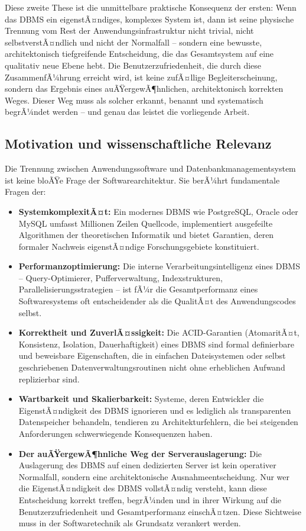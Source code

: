 ﻿\documentclass[a4paper,12pt]{article}
\theoremstyle{definition}
\begin{document}
Diese zweite These ist die unmittelbare praktische Konsequenz der ersten: Wenn das DBMS ein eigenstÃ¤ndiges, komplexes System ist, dann ist seine physische Trennung vom Rest der Anwendungsinfrastruktur nicht trivial, nicht selbstverstÃ¤ndlich und nicht der Normalfall -- sondern eine bewusste, architektonisch tiefgreifende Entscheidung, die das Gesamtsystem auf eine qualitativ neue Ebene hebt. Die Benutzerzufriedenheit, die durch diese ZusammenfÃ¼hrung erreicht wird, ist keine zufÃ¤llige Begleiterscheinung, sondern das Ergebnis eines auÃŸergewÃ¶hnlichen, architektonisch korrekten Weges. Dieser Weg muss als solcher erkannt, benannt und systematisch begrÃ¼ndet werden -- und genau das leistet die vorliegende Arbeit.

\subsection{Motivation und wissenschaftliche Relevanz}

Die Trennung zwischen Anwendungssoftware und Datenbankmanagementsystem ist keine bloÃŸe Frage der Softwarearchitektur. Sie berÃ¼hrt fundamentale Fragen der:

\begin{itemize}
	\item \textbf{SystemkomplexitÃ¤t:} Ein modernes DBMS wie PostgreSQL, Oracle oder MySQL umfasst Millionen Zeilen Quellcode, implementiert ausgefeilte Algorithmen der theoretischen Informatik und bietet Garantien, deren formaler Nachweis eigenstÃ¤ndige Forschungsgebiete konstituiert.
	\item \textbf{Performanzoptimierung:} Die interne Verarbeitungsintelligenz eines DBMS -- Query-Optimierer, Pufferverwaltung, Indexstrukturen, Parallelisierungsstrategien -- ist fÃ¼r die Gesamtperformanz eines Softwaresystems oft entscheidender als die QualitÃ¤t des Anwendungscodes selbst.
	\item \textbf{Korrektheit und ZuverlÃ¤ssigkeit:} Die ACID-Garantien (AtomaritÃ¤t, Konsistenz, Isolation, Dauerhaftigkeit) eines DBMS sind formal definierbare und beweisbare Eigenschaften, die in einfachen Dateisystemen oder selbst geschriebenen Datenverwaltungsroutinen nicht ohne erheblichen Aufwand replizierbar sind.
	\item \textbf{Wartbarkeit und Skalierbarkeit:} Systeme, deren Entwickler die EigenstÃ¤ndigkeit des DBMS ignorieren und es lediglich als transparenten Datenspeicher behandeln, tendieren zu Architekturfehlern, die bei steigenden Anforderungen schwerwiegende Konsequenzen haben.
\item \textbf{Der auÃŸergewÃ¶hnliche Weg der Serverauslagerung:} Die Auslagerung des DBMS auf einen dedizierten Server ist kein operativer Normalfall, sondern eine architektonische Ausnahmeentscheidung. Nur wer die EigenstÃ¤ndigkeit des DBMS vollstÃ¤ndig versteht, kann diese Entscheidung korrekt treffen, begrÃ¼nden und in ihrer Wirkung auf die Benutzerzufriedenheit und Gesamtperformanz einschÃ¤tzen. Diese Sichtweise muss in der Softwaretechnik als Grundsatz verankert werden.
\end{itemize}
\end{document}

